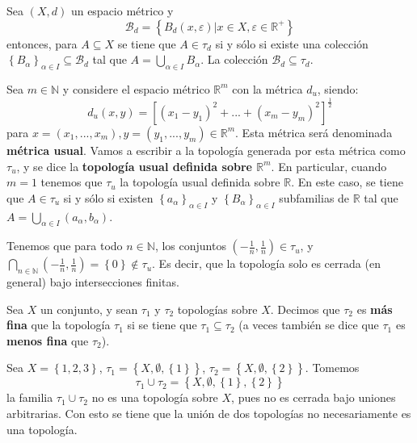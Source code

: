 \documentclass[12pt]{report}
\theoremstyle{largebreak}
\begin{document}
    \begin{cor}
        Sea $(X,d)$ un espacio métrico y
        \begin{equation*}
            \mathcal{B}_d=\left\{B_d(x,\varepsilon)|x\in X,\varepsilon\in\mathbb{R}^+ \right\}
        \end{equation*}
        entonces, para $A\subseteq X$ se tiene que $A\in\tau_d$ si y sólo si existe una colección $\left\{B_\alpha \right\}_{\alpha\in I}\subseteq \mathcal{B}_d$ tal que $A=\bigcup_{\alpha\in I}B_\alpha$. La colección $\mathcal{B}_d\subseteq\tau_d$.
    \end{cor}

    \begin{exa}
        Sea $m\in\mathbb{N}$ y considere el espacio métrico $\mathbb{R}^m$ con la métrica $d_u$, siendo:
        \begin{equation*}
            d_u(x,y)=[(x_1-y_1)^2+...+(x_m-y_m)^2]^{\frac{1}{2}}
        \end{equation*}
        para $x=(x_1,...,x_m),y=(y_1,...,y_m)\in\mathbb{R}^m$. Esta métrica será denominada \textbf{métrica usual}. Vamos a escribir a la topología generada por esta métrica como $\tau_u$, y se dice la \textbf{topología usual definida sobre $\mathbb{R}^m$}. En particular, cuando $m=1$ tenemos que $\tau_u$ la topología usual definida sobre $\mathbb{R}$. En este caso, se tiene que $A\in\tau_u$ si y sólo si existen $\left\{a_\alpha\right\}_{\alpha\in I}$ y $\left\{B_\alpha\right\}_{\alpha\in I}$ subfamilias de $\mathbb{R}$ tal que $A=\bigcup_{\alpha\in I}\left(a_\alpha,b_\alpha\right)$.
    \end{exa}

    \begin{obs}
        Tenemos que para todo $n\in\mathbb{N}$, los conjuntos $\left(-\frac{1}{n},\frac{1}{n}\right)\in\tau_u$, y $\bigcap_{n\in\mathbb{N}}\left(-\frac{1}{n},\frac{1}{n}\right)=\left\{0\right\}\notin\tau_u$. Es decir, que la topología solo es cerrada (en general) bajo intersecciones finitas.
    \end{obs}

    \begin{mydef}
        Sea $X$ un conjunto, y sean $\tau_1$ y $\tau_2$ topologías sobre $X$. Decimos que $\tau_2$ es \textbf{más fina} que la topología $\tau_1$ si se tiene que $\tau_1\subseteq\tau_2$ (a veces también se dice que $\tau_1$ es \textbf{menos fina} que $\tau_2$).
    \end{mydef}

    \begin{exa}
        Sea $X=\left\{1,2,3\right\}$, $\tau_1=\left\{X,\emptyset,\left\{1\right\} \right\}$, $\tau_2=\left\{X,\emptyset,\left\{2\right\} \right\}$. Tomemos
        \begin{equation*}
            \tau_1\cup\tau_2=\left\{X,\emptyset,\left\{1\right\},\left\{2\right\}\right\}
        \end{equation*}
        la familia $\tau_1\cup\tau_2$ no es una topología sobre $X$, pues no es cerrada bajo uniones arbitrarias. Con esto se tiene que la unión de dos topologías no necesariamente es una topología.
    \end{exa}
\end{document}
